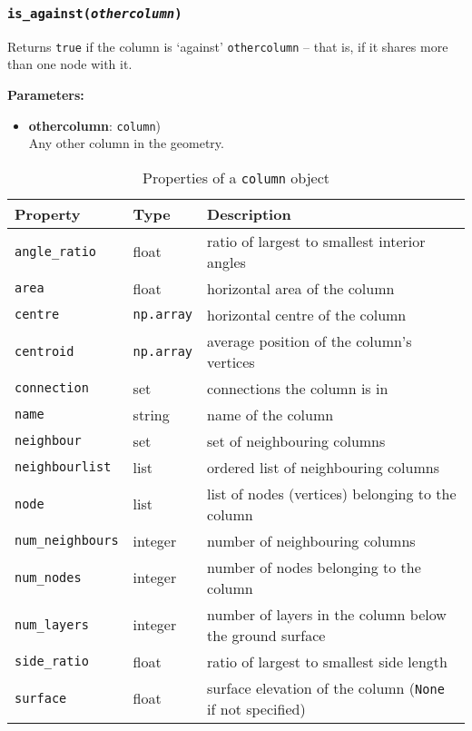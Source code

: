 \begin{snugshade}
\subsubsection{\texttt{is\_against(\emph{othercolumn})}}
\end{snugshade}
\label{sec:column:is_against}

Returns \texttt{true} if the column is `against' \texttt{othercolumn} -- that is, if it shares more than one node with it.

\textbf{Parameters:}
\begin{itemize}
\item \textbf{othercolumn}: \texttt{column})\\
  Any other column in the geometry.
\end{itemize}

\begin{table}
  \begin{center}
    \begin{tabular}{|l|l|l|}
      \hline
      \textbf{Property} & \textbf{Type} & \textbf{Description}\\
      \hline
      \texttt{angle\_ratio} & float & ratio of largest to smallest interior angles \\
      \texttt{area} & float & horizontal area of the column \\
      \texttt{centre} & \texttt{np.array} & horizontal centre of the column \\
      \texttt{centroid} & \texttt{np.array} & average position of the column's vertices \\
      \texttt{connection} & set & connections the column is in \\
      \texttt{name} & string & name of the column \\
      \texttt{neighbour} & set & set of neighbouring columns \\
      \texttt{neighbourlist} & list & ordered list of neighbouring columns \\
      \texttt{node} & list & list of nodes (vertices) belonging to the column \\
      \texttt{num\_neighbours} & integer & number of neighbouring columns \\
      \texttt{num\_nodes} & integer & number of nodes belonging to the column \\
      \texttt{num\_layers} & integer & number of layers in the column below the ground surface \\
      \texttt{side\_ratio} & float & ratio of largest to smallest side length \\
      \texttt{surface} & float & surface elevation of the column (\texttt{None} if not specified)\\
      \hline
    \end{tabular}
    \caption{Properties of a \texttt{column} object}
    \label{tb:column_properties}
  \end{center}
\end{table}

